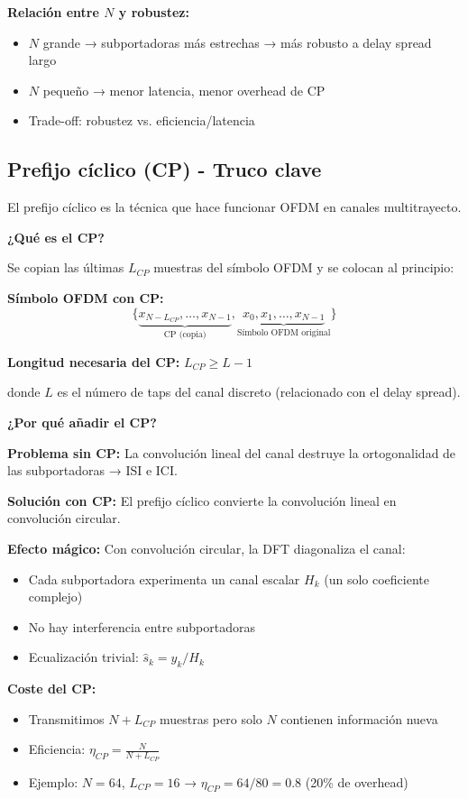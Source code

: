 \documentclass[10pt,a4paper]{article}
\begin{document}
\textbf{Relación entre $N$ y robustez:}
\begin{itemize}
\item $N$ grande → subportadoras más estrechas → más robusto a delay spread largo
\item $N$ pequeño → menor latencia, menor overhead de CP
\item Trade-off: robustez vs. eficiencia/latencia
\end{itemize}

\subsection{Prefijo cíclico (CP) - Truco clave}

El prefijo cíclico es la técnica que hace funcionar OFDM en canales multitrayecto.

\textbf{¿Qué es el CP?}

Se copian las últimas $L_{CP}$ muestras del símbolo OFDM y se colocan al principio:

\textbf{Símbolo OFDM con CP:}
$$\{\underbrace{x_{N-L_{CP}}, \ldots, x_{N-1}}_{\text{CP (copia)}}, \underbrace{x_0, x_1, \ldots, x_{N-1}}_{\text{Símbolo OFDM original}}\}$$

\textbf{Longitud necesaria del CP:} $L_{CP} \geq L - 1$

donde $L$ es el número de taps del canal discreto (relacionado con el delay spread).

\textbf{¿Por qué añadir el CP?}

\textbf{Problema sin CP:} La convolución lineal del canal destruye la ortogonalidad de las subportadoras → ISI e ICI.

\textbf{Solución con CP:} El prefijo cíclico convierte la convolución lineal en convolución circular.

\textbf{Efecto mágico:} Con convolución circular, la DFT diagonaliza el canal:
\begin{itemize}
\item Cada subportadora experimenta un canal escalar $H_k$ (un solo coeficiente complejo)
\item No hay interferencia entre subportadoras
\item Ecualización trivial: $\hat{s}_k = y_k / H_k$
\end{itemize}

\textbf{Coste del CP:}
\begin{itemize}
\item Transmitimos $N + L_{CP}$ muestras pero solo $N$ contienen información nueva
\item Eficiencia: $\eta_{CP} = \frac{N}{N + L_{CP}}$
\item Ejemplo: $N=64$, $L_{CP}=16$ → $\eta_{CP} = 64/80 = 0.8$ (20\% de overhead)
\end{itemize}
\end{document}
